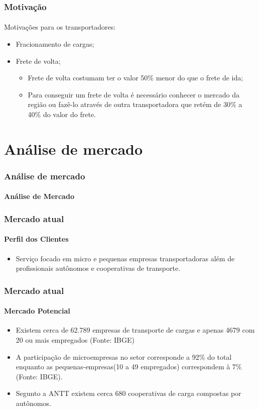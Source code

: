 \documentclass{beamer}
\begin{document}
\begin{frame}
  \frametitle{Motivação}
  \framesubtitle{}
  
  Motivações para os transportadores:
    \begin{itemize}
    \item Fracionamento de cargas;
    \item Frete de volta;
      \begin{itemize}
      \item Frete de volta costumam ter o valor 50\% menor do que o frete de ida;\\
      \item Para conseguir um frete de volta é necessário conhecer o mercado da região ou fazê-lo através de outra transportadora que retém de 30\% a 40\% do valor do frete.
      \end{itemize}
    \end{itemize}
\end{frame}


\section{Análise de mercado}

\begin{frame}
  \frametitle{Análise de mercado}
  \framesubtitle{}

  \begin{center}
    {\huge\textbf{Análise de Mercado}}

  \end{center}
\end{frame}

\begin{frame}
  \frametitle{Mercado atual}

  \framesubtitle{Perfil dos Clientes}
      \begin{itemize}
      \item Serviço focado em micro e pequenas empresas transportadoras além de profissionais autônomos e cooperativas de transporte.
      \end{itemize}
\end{frame}

\begin{frame}
  \frametitle{Mercado atual}
  \framesubtitle{Mercado Potencial}
      \begin{itemize}
      \item Existem cerca de 62.789 empresas de transporte de cargas e apenas 4679 com 20 ou mais empregados (Fonte: IBGE)
      \item A participação de microempresas no setor corresponde a 92\% do total enquanto as pequenas-empresas(10 a 49 empregados) correspondem à 7\%(Fonte: IBGE).
      \item Segunto a ANTT existem cerca 680 cooperativas de carga compostas por autônomos.
      \end{itemize}
\end{frame}
\end{document}
